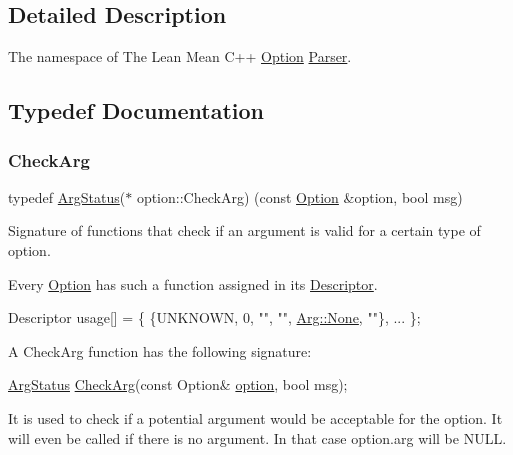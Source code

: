 \subsection{Detailed Description}
The namespace of The Lean Mean C++ \hyperlink{classoption_1_1_option}{Option} \hyperlink{classoption_1_1_parser}{Parser}. 

\subsection{Typedef Documentation}
\mbox{\label{namespaceoption_a4cdf403efae65e18bf850e2001b12a2a}} 
\subsubsection{\texorpdfstring{Check\+Arg}{CheckArg}}
{\footnotesize\ttfamily typedef \hyperlink{namespaceoption_aee8c76a07877335762631491e7a5a1a9}{Arg\+Status}($\ast$ option\+::\+Check\+Arg) (const \hyperlink{classoption_1_1_option}{Option} \&option, bool msg)}



Signature of functions that check if an argument is valid for a certain type of option. 

Every \hyperlink{classoption_1_1_option}{Option} has such a function assigned in its \hyperlink{structoption_1_1_descriptor}{Descriptor}. 
\begin{DoxyCode}
Descriptor usage[] = \{ \{UNKNOWN, 0, \textcolor{stringliteral}{""}, \textcolor{stringliteral}{""}, \hyperlink{structoption_1_1_arg_a7fc01987899c91c6b6a1be5711a46e22}{Arg::None}, \textcolor{stringliteral}{""}\}, ... \};
\end{DoxyCode}


A Check\+Arg function has the following signature\+: 
\begin{DoxyCode}
\hyperlink{namespaceoption_aee8c76a07877335762631491e7a5a1a9}{ArgStatus} \hyperlink{namespaceoption_a4cdf403efae65e18bf850e2001b12a2a}{CheckArg}(\textcolor{keyword}{const} Option& \hyperlink{namespaceoption}{option}, \textcolor{keywordtype}{bool} msg); 
\end{DoxyCode}


It is used to check if a potential argument would be acceptable for the option. It will even be called if there is no argument. In that case {\ttfamily option.\+arg} will be {\ttfamily N\+U\+LL}.

